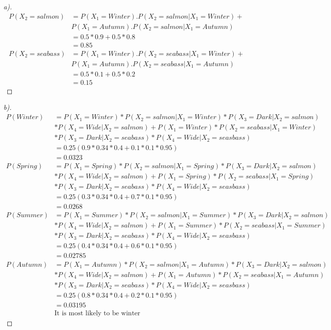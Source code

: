 \documentclass[12pt]{article}
\newenvironment{theorem}[2][Theorem]{\begin{trivlist}
\item[\hskip \labelsep {\bfseries #1}\hskip \labelsep {\bfseries #2.}]}{\end{trivlist}}
\begin{document}
\pagebreak
\begin{theorem}[Ans]{6}
\begin{proof}[a)]
\begin{align*}
P(X_{2} = salmon) &= P(X_{1}=Winter).P(X_{2} = salmon|X_{1}=Winter) + \\
& P(X_{1}=Autumn).P(X_{2} = salmon|X_{1}=Autumn) \\
&= 0.5*0.9+0.5*0.8 \\ 
&= 0.85\\
P(X_{2} = seabass) &= P(X_{1}=Winter).P(X_{2} = seabass|X_{1}=Winter) + \\
& P(X_{1}=Autumn).P(X_{2} = seabass|X_{1}=Autumn) \\
&= 0.5*0.1+0.5*0.2 \\ 
&= 0.15
\end{align*}
\end{proof}
\begin{proof}[b)]
\begin{align*}
P(Winter) &= P(X_{1} = Winter)*P(X_{2} = salmon|X_{1}=Winter)*P(X_{3}=Dark|X_{2} = salmon)\\
&*P(X_{4}=Wide|X_{2} = salmon)+P(X_{1} = Winter)*P(X_{2} = seabass|X_{1}=Winter)\\
&*P(X_{3}=Dark|X_{2} = seabass)*P(X_{4}=Wide|X_{2} = seasbass)\\
&= 0.25(0.9*0.34*0.4+0.1*0.1*0.95)\\
&=0.0323\\
P(Spring) &= P(X_{1} = Spring)*P(X_{2} = salmon|X_{1}=Spring)*P(X_{3}=Dark|X_{2} = salmon)\\
&*P(X_{4}=Wide|X_{2} = salmon)+P(X_{1} = Spring)*P(X_{2} = seabass|X_{1}=Spring)\\
&*P(X_{3}=Dark|X_{2} = seabass)*P(X_{4}=Wide|X_{2} = seasbass)\\
&= 0.25(0.3*0.34*0.4+0.7*0.1*0.95)\\
&=0.0268\\
P(Summer) &= P(X_{1} = Summer)*P(X_{2} = salmon|X_{1}=Summer)*P(X_{3}=Dark|X_{2} = salmon)\\
&*P(X_{4}=Wide|X_{2} = salmon)+P(X_{1} = Summer)*P(X_{2} = seabass|X_{1}=Summer)\\
&*P(X_{3}=Dark|X_{2} = seabass)*P(X_{4}=Wide|X_{2} = seasbass)\\
&= 0.25(0.4*0.34*0.4+0.6*0.1*0.95)\\
&=0.02785\\
P(Autumn) &= P(X_{1} = Autumn)*P(X_{2} = salmon|X_{1}=Autumn)*P(X_{3}=Dark|X_{2} = salmon)\\
&*P(X_{4}=Wide|X_{2} = salmon)+P(X_{1} = Autumn)*P(X_{2} = seabass|X_{1}=Autumn)\\
&*P(X_{3}=Dark|X_{2} = seabass)*P(X_{4}=Wide|X_{2} = seasbass)\\
&= 0.25(0.8*0.34*0.4+0.2*0.1*0.95)\\
&=0.03195\\
&\text{It is most likely to be winter}
\end{align*}
\end{proof}
\end{theorem}
\end{document}
